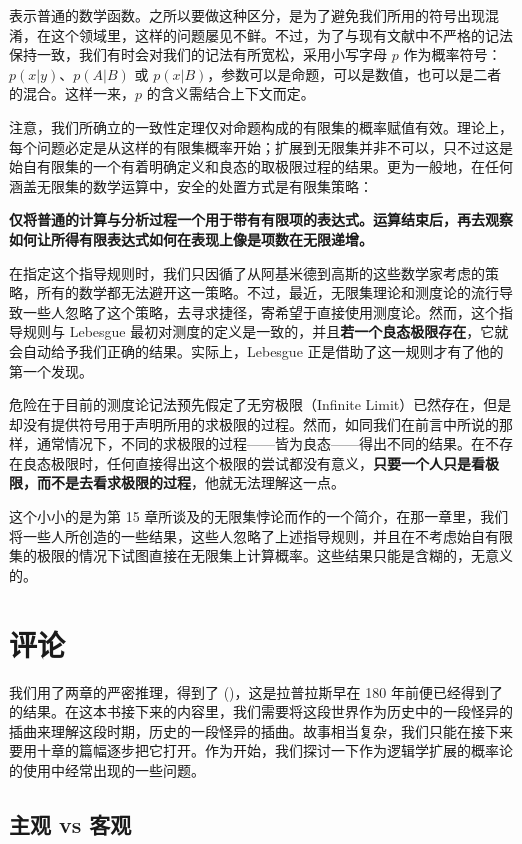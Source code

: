 表示普通的数学函数。之所以要做这种区分，是为了避免我们所用的符号出现混淆，在这个领域里，这样的问题屡见不鲜。不过，为了与现有文献中不严格的记法保持一致，我们有时会对我们的记法有所宽松，采用小写字母 $p$ 作为概率符号：$p(x|y)$、$p(A|B)$ 或 $p(x|B)$，参数可以是命题，可以是数值，也可以是二者的混合。这样一来，$p$ 的含义需结合上下文而定。

注意，我们所确立的一致性定理仅对命题构成的有限集的概率赋值有效。理论上，每个问题必定是从这样的有限集概率开始；扩展到无限集并非不可以，只不过这是始自有限集的一个有着明确定义和良态的取极限过程的结果。更为一般地，在任何涵盖无限集的数学运算中，安全的处置方式是有限集策略：

{\bf 仅将普通的计算与分析过程一个用于带有有限项的表达式。运算结束后，再去观察如何让所得有限表达式如何在表现上像是项数在无限递增。}

在指定这个指导规则时，我们只因循了从阿基米德到高斯的这些数学家考虑的策略，所有的数学都无法避开这一策略。不过，最近，无限集理论和测度论的流行导致一些人忽略了这个策略，去寻求捷径，寄希望于直接使用测度论。然而，这个指导规则与 Lebesgue 最初对测度的定义是一致的，并且{\bf 若一个良态极限存在}，它就会自动给予我们正确的结果。实际上，Lebesgue 正是借助了这一规则才有了他的第一个发现。

危险在于目前的测度论记法预先假定了无穷极限（Infinite Limit）已然存在，但是却没有提供符号用于声明所用的求极限的过程。然而，如同我们在前言中所说的那样，通常情况下，不同的求极限的过程——皆为良态——得出不同的结果。在不存在良态极限时，任何直接得出这个极限的尝试都没有意义，{\bf 只要一个人只是看极限，而不是去看求极限的过程}，他就无法理解这一点。

这个小小的是为第 15 章所谈及的无限集悖论而作的一个简介，在那一章里，我们将一些人所创造的一些结果，这些人忽略了上述指导规则，并且在不考虑始自有限集的极限的情况下试图直接在无限集上计算概率。这些结果只能是含糊的，无意义的。

\section{评论}

我们用了两章的严密推理，得到了 (\in[2-99])，这是拉普拉斯早在 180 年前便已经得到了的结果。在这本书接下来的内容里，我们需要将这段世界作为历史中的一段怪异的插曲来理解这段时期，历史的一段怪异的插曲。故事相当复杂，我们只能在接下来要用十章的篇幅逐步把它打开。作为开始，我们探讨一下作为逻辑学扩展的概率论的使用中经常出现的一些问题。

\subsection{主观 vs 客观}

